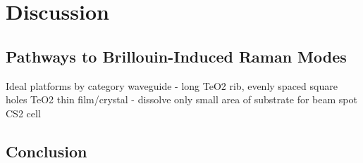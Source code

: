 
\section{Discussion}
\label{sec:Raman:Discussion}

\subsection{Pathways to Brillouin-Induced Raman Modes}
\label{subsec:Raman:Pathways}
Ideal platforms by category
  waveguide - long TeO2 rib, evenly spaced square holes
  TeO2 thin film/crystal - dissolve only small area of substrate for beam spot
  CS2 cell

\subsection{Conclusion}
\label{subsec:Raman:Conclusion}


\clearpage
\thispagestyle{empty}
\null
\newpage
